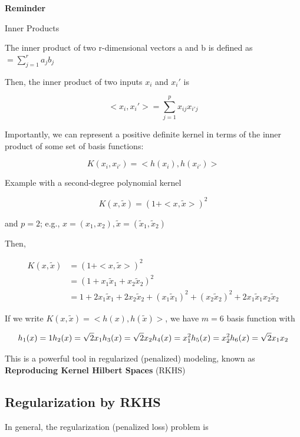 \documentclass[
]{book}
\begin{document}
\textbf{Reminder}

Inner Products

The inner product of two r-dimensional vectors a and b is defined as \(<a,b> = \sum_{j=1}^r a_j b_j\)

Then, the inner product of two inputs \(x_i\) and \(x_i'\) is

\[
<x_i, x_i'> = \sum_{j= 1}^p x_{ij} x_{i'j}
\]

Importantly, we can represent a positive definite kernel in terms of the inner product of some set of basis functions:

\[
K(x_i, x_{i'}) = < h(x_i), h(x_{i'})>
\]

Example with a second-degree polynomial kernel

\[
K(x, \tilde{x}) = (1 + <x, \tilde{x}>)^2
\]

and \(p = 2\); e.g., \(x = (x_1, x_2), \tilde{x} = (\tilde{x}_1, \tilde{x}_2)\)

Then,

\[
\begin{aligned}
K(x, \tilde{x}) &= (1 + < x, \tilde{x}>)^2 \\
& = (1 + x_1 \tilde{x}_1 + x_2  \tilde{x}_2)^2 \\
&= 1 + 2 x_1 \tilde{x}_1 + 2 x_2 \tilde{x}_2 + (x_1 \tilde{x}_1)^2 + (x_2 \tilde{x}_2)^2 + 2 x_1 \tilde{x}_1 x_2 \tilde{x}_2
\end{aligned}
\]

If we write \(K(x, \tilde{x}) = <h(x), h(\tilde{x})>\), we have \(m = 6\) basis function with

\[
h_1(x) = 1 \\
h_2(x) = \sqrt{2}x_1 \\
h_3(x) = \sqrt{2}x_2 \\
h_4 (x) = x_1^2 \\
h_5 (x) = x_2^2 \\
h_6(x) = \sqrt{2} x_1 x_2
\]

This is a powerful tool in regularized (penalized) modeling, known as \textbf{Reproducing Kernel Hilbert Spaces} (RKHS)

\hypertarget{regularization-by-rkhs}{%
\subsection{Regularization by RKHS}\label{regularization-by-rkhs}}

\citep[5.8]{hastie2001a}

In general, the regularization (penalized loss) problem is
\end{document}
